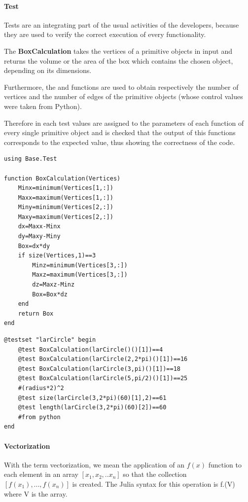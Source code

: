 \documentclass{article}
\begin{document}
\paragraph{Test\\}

Tests are an integrating part of the usual activities of the developers, because they are used to verify the correct execution of every functionality.  

The \textbf{BoxCalculation} takes the vertices of a primitive objects in input and returns the volume or the area of the box which contains the chosen object, depending on its dimensions.

Furthermore, the  and  functions are used to obtain respectively the number of vertices and the number of edges of the primitive objects (whose control values were taken from Python).

Therefore in each test values are assigned to the parameters of each function of every single primitive object and is checked that the output of this functions corresponds to the expected value, thus showing the correctness of the code.

\begin{Verbatim}
using Base.Test

function BoxCalculation(Vertices)
	Minx=minimum(Vertices[1,:])
	Maxx=maximum(Vertices[1,:])
	Miny=minimum(Vertices[2,:])
	Maxy=maximum(Vertices[2,:])
	dx=Maxx-Minx
	dy=Maxy-Miny
	Box=dx*dy
	if size(Vertices,1)==3
		Minz=minimum(Vertices[3,:])
		Maxz=maximum(Vertices[3,:])
		dz=Maxz-Minz
		Box=Box*dz
	end
	return Box
end
\end{Verbatim}

\begin{Verbatim}
@testset "larCircle" begin
	@test BoxCalculation(larCircle()()[1])==4
	@test BoxCalculation(larCircle(2,2*pi)()[1])==16
	@test BoxCalculation(larCircle(3,pi)()[1])==18
	@test BoxCalculation(larCircle(5,pi/2)()[1])==25
	#(radius*2)^2
	@test size(larCircle(3,2*pi)(60)[1],2)==61
	@test length(larCircle(3,2*pi)(60)[2])==60
	#from python
end
\end{Verbatim}

\paragraph{Vectorization\\}

With the term vectorization, we mean the application of an $f(x)$ function to each element in an array $[x_1,x_2,..x_n]$ so that the collection $[f(x_1),...,f(x_n)]$ is created. The Julia syntax for this operation is f.(V) where V is the array.
\end{document}
